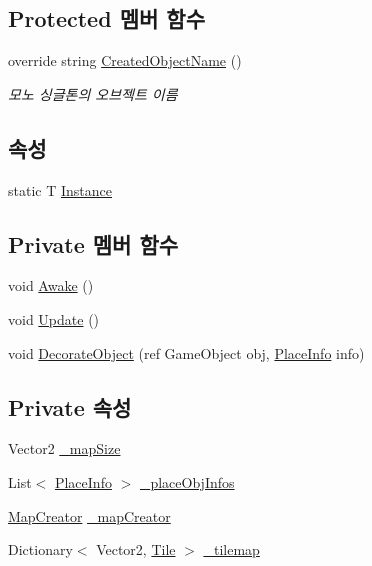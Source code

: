 \subsection*{Protected 멤버 함수}
\begin{DoxyCompactItemize}
\item 
override string \hyperlink{class_map_manager_aa3459a9fe2d748c6e9f2c3da8a6273cd}{Created\+Object\+Name} ()
\begin{DoxyCompactList}\small\item\em 모노 싱글톤의 오브젝트 이름 \end{DoxyCompactList}\end{DoxyCompactItemize}
\subsection*{속성}
\begin{DoxyCompactItemize}
\item 
static T \hyperlink{class_m_c_n_1_1_mono_singletone_aa50c027cca64cf4ad30c1ee5c83e0b78}{Instance}
\end{DoxyCompactItemize}
\subsection*{Private 멤버 함수}
\begin{DoxyCompactItemize}
\item 
void \hyperlink{class_map_manager_ad633984007048c7d63eab44aaeb0c32d}{Awake} ()
\item 
void \hyperlink{class_map_manager_aeaf61c0a498d98a5ac778db479353d77}{Update} ()
\item 
void \hyperlink{class_map_manager_a31c2b0b9cf8f208a596b65e7f1d88873}{Decorate\+Object} (ref Game\+Object obj, \hyperlink{class_map_manager_1_1_place_info}{Place\+Info} info)
\end{DoxyCompactItemize}
\subsection*{Private 속성}
\begin{DoxyCompactItemize}
\item 
Vector2 \hyperlink{class_map_manager_a960f398cc92f569f620ddc8c0140a5c7}{\+\_\+map\+Size}
\item 
List$<$ \hyperlink{class_map_manager_1_1_place_info}{Place\+Info} $>$ \hyperlink{class_map_manager_ab581d2c754246f74999a0b744ba2b14f}{\+\_\+place\+Obj\+Infos}
\item 
\hyperlink{class_map_creator}{Map\+Creator} \hyperlink{class_map_manager_aa837a852f355a33b263c1bb07c6c4ece}{\+\_\+map\+Creator}
\item 
Dictionary$<$ Vector2, \hyperlink{class_tile}{Tile} $>$ \hyperlink{class_map_manager_a58f7635d8e19795f3845a3f85e2b4ac3}{\+\_\+tilemap}
\end{DoxyCompactItemize}



